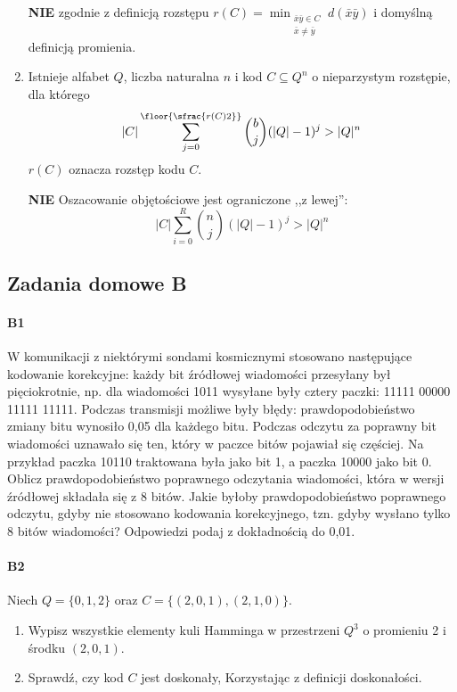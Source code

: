 \begin{enumerate}[label=\alph*)]
\textbf{NIE} zgodnie z definicją rozstępu $r(C)=\min _{\begin{matrix}
\bar{x}\bar{y}\in C\\
\bar{x}\neq\bar{y}
\end{matrix}}d(\bar{x}\bar{y})$ i domyślną definicją promienia.
\item Istnieje alfabet $Q$, liczba naturalna $n$ i kod $C \subseteq Q^n$ o nieparzystym rozstępie, dla którego $$|C|\sum ^{\floor{\sfrac{r(C){2}}}} _{j=0} \binom{b}{j}(|Q| - 1)^j > |Q|^n$$ $r(C)$ oznacza rozstęp kodu $C$.

\textbf{NIE} Oszacowanie objętościowe jest ograniczone ,,z lewej'':
$$|C|\sum ^{R} _{i=0} \binom{n}{j}(|Q| - 1)^j > |Q|^n$$
\end{enumerate}

\subsection{Zadania domowe B}
\paragraph{B1} W komunikacji z niektórymi sondami kosmicznymi stosowano następujące kodowanie korekcyjne: każdy bit źródłowej wiadomości przesyłany był pięciokrotnie, np. dla wiadomości 1011 wysyłane były cztery paczki: 11111 00000 11111 11111. Podczas transmisji możliwe były błędy: prawdopodobieństwo zmiany bitu wynosiło 0,05 dla każdego bitu. Podczas odczytu za poprawny bit wiadomości uznawało się ten, który w paczce bitów pojawiał się częściej. Na przykład paczka 10110 traktowana była jako bit 1, a paczka 10000 jako bit 0. Oblicz prawdopodobieństwo poprawnego odczytania wiadomości, która w wersji źródłowej składała się z 8 bitów. Jakie byłoby prawdopodobieństwo poprawnego odczytu, gdyby nie stosowano kodowania korekcyjnego, tzn. gdyby wysłano tylko 8 bitów wiadomości? Odpowiedzi podaj z dokładnością do 0,01.

\paragraph{B2} Niech $Q = \{0, 1, 2\}$ oraz $C = \{(2, 0, 1),(2, 1, 0)\}$.
\begin{enumerate}[label=\alph*)]
\item Wypisz wszystkie elementy kuli Hamminga w przestrzeni $Q^3$ o promieniu 2 i środku $(2, 0, 1)$.
\item Sprawdź, czy kod $C$ jest doskonały, Korzystając z definicji doskonałości.
\end{enumerate}

